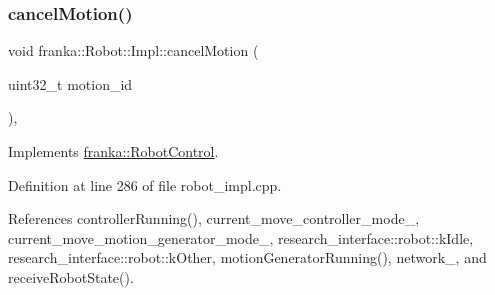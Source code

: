\subsubsection{\texorpdfstring{cancel\+Motion()}{cancelMotion()}}
{\footnotesize\ttfamily void franka\+::\+Robot\+::\+Impl\+::cancel\+Motion (\begin{DoxyParamCaption}\item[{uint32\+\_\+t}]{motion\+\_\+id }\end{DoxyParamCaption})\hspace{0.3cm}{\ttfamily [override]}, {\ttfamily [virtual]}}



Implements \hyperlink{classfranka_1_1RobotControl_a8eb19b5e21e2ac8d9c98bffe2dd9124d}{franka\+::\+Robot\+Control}.



Definition at line 286 of file robot\+\_\+impl.\+cpp.



References controller\+Running(), current\+\_\+move\+\_\+controller\+\_\+mode\+\_\+, current\+\_\+move\+\_\+motion\+\_\+generator\+\_\+mode\+\_\+, research\+\_\+interface\+::robot\+::k\+Idle, research\+\_\+interface\+::robot\+::k\+Other, motion\+Generator\+Running(), network\+\_\+, and receive\+Robot\+State().


